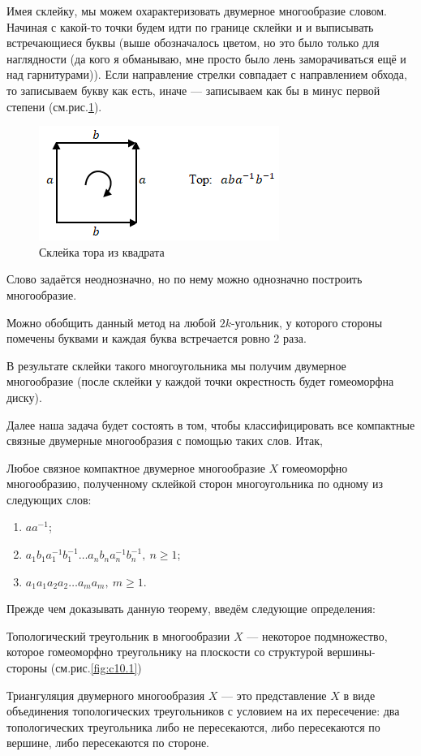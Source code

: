 Имея склейку, мы можем охарактеризовать двумерное многообразие словом. Начиная с какой-то точки будем идти по границе склейки и и выписывать встречающиеся буквы (выше обозначалось цветом, но это было только для наглядности (да кого я обманываю, мне просто было лень заморачиваться ещё и над гарнитурами)). Если направление стрелки совпадает с направлением обхода, то записываем букву как есть, иначе — записываем как бы в минус первой степени (см.рис.\ref{fig:c10.2}).

\begin{figure}[H]
    \centering
    \includegraphics[scale=1]{images/c10.2.png}
    \caption{Склейка тора из квадрата}
    \label{fig:c10.2}
\end{figure}

Слово задаётся неоднозначно, но по нему можно однозначно построить многообразие.

Можно обобщить данный метод на любой $2k$-угольник, у которого стороны помечены буквами и каждая буква встречается ровно 2 раза.

В результате склейки такого многоугольника мы получим двумерное многообразие (после склейки у каждой точки окрестность будет гомеоморфна диску).

Далее наша задача будет состоять в том, чтобы классифицировать все компактные связные двумерные многообразия с помощью таких слов. Итак,

\begin{theorem}
    Любое связное компактное двумерное многообразие $X$ гомеоморфно многообразию, полученному склейкой сторон многоугольника по одному из следующих слов:
    \begin{enumerate}
        \item $aa^{-1}$;
        \item $a_1b_1a_1^{-1}b_1^{-1}\dots a_n b_n a_n^{-1} b_n^{-1}, \ n \geqslant 1$;
        \item $a_1 a_1 a_2 a_2 \dots a_m a_m, \ m \geqslant 1$.
    \end{enumerate}
\end{theorem} 
Прежде чем доказывать данную теорему, введём следующие определения:
\begin{definition}
    Топологический треугольник в многообразии $X$ — некоторое подмножество, которое гомеоморфно треугольнику на плоскости со структурой вершины-стороны (см.рис.\ref{fig:c10.1})
\end{definition} 
\begin{definition}
    Триангуляция двумерного многообразия $X$ — это представление $X$ в виде объединения топологических треугольников с условием на их пересечение: два топологических треугольника либо не пересекаются, либо пересекаются по вершине, либо пересекаются по стороне.
\end{definition} 

